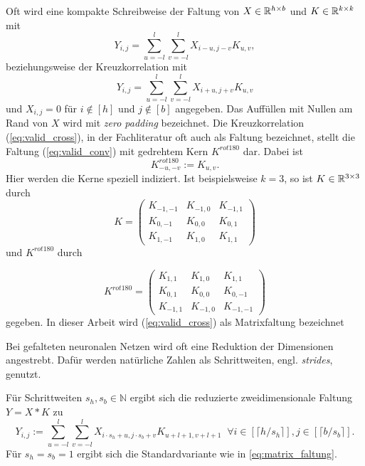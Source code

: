 \begin{bem}
    \label{bem:K_conv_komp}
    Oft wird eine kompakte Schreibweise der Faltung von $X \in \mathbb{R}^{h \times b}$ und $ K \in \mathbb{R}^{k \times k}$ mit 
    \begin{equation}
        \label{eq:valid_conv}
        Y_{i,j}=\sum_{u=-l}^l \sum_{v=-l}^l X_{i-u,j-v}K_{u,v},
    \end{equation} beziehungsweise der Kreuzkorrelation mit
    \begin{equation}
        \label{eq:valid_cross}
        Y_{i,j}=\sum_{u=-l}^l \sum_{v=-l}^l X_{i+u,j+v}K_{u,v}
    \end{equation}
    und $X_{i,j}=0$ für $i \notin [h]$ und $j \notin [b]$ angegeben. Das Auffüllen mit Nullen am Rand von $X$ wird mit \textit{zero padding} bezeichnet. Die Kreuzkorrelation (\ref{eq:valid_cross}), in der Fachliteratur oft auch als Faltung bezeichnet, stellt die Faltung (\ref{eq:valid_conv}) mit gedrehtem Kern $K^{rot180}$ dar. Dabei ist 
    \begin{equation*}
        K^{rot180}_{-u,-v}:=K_{u,v}.
    \end{equation*}
    Hier werden die Kerne speziell indiziert. Ist beispielsweise $k=3$, so ist $K \in \mathbb{R}^{3 \times 3}$ durch
    \begin{equation*}
        K=\begin{pmatrix}
            K_{-1,-1} &K_{-1,0} &K_{-1,1} \\
            K_{0,-1} &K_{0,0} &K_{0,1}  \\
            K_{1,-1} &K_{1,0} &K_{1,1} 
        \end{pmatrix}
    \end{equation*} und $K^{rot180}$ durch

    \begin{equation*}
        K^{rot180}=\begin{pmatrix}
            K_{1,1} &K_{1,0} &K_{1,1} \\
            K_{0,1} &K_{0,0} &K_{0,-1}  \\
            K_{-1,1} &K_{-1,0} &K_{-1,-1} 
        \end{pmatrix}
    \end{equation*}
    gegeben. In dieser Arbeit wird (\ref{eq:valid_cross}) als Matrixfaltung bezeichnet
\end{bem}

Bei gefalteten neuronalen Netzen wird oft eine Reduktion der Dimensionen angestrebt. Dafür werden natürliche Zahlen als Schrittweiten, engl. \textit{strides}, genutzt.
\begin{bem}\label{bem_strides}
    Für Schrittweiten $s_h, s_b \in \mathbb{N}$ ergibt sich die reduzierte zweidimensionale Faltung $Y=X \ast K$ zu
    \begin{equation*}
        Y_{i,j}:=\sum_{u=-l}^{l} \sum_{v=-l}^{l} X_{i \cdot s_h +u,j \cdot s_b +v} K_{u+l+1, v+l+1}\; \; \forall i \in [\lceil h/s_h \rceil], j \in [\lceil b/s_b \rceil].
    \end{equation*}
    Für $s_h=s_b=1$ ergibt sich die Standardvariante wie in \ref{eq:matrix_faltung}.
    \end{bem}

